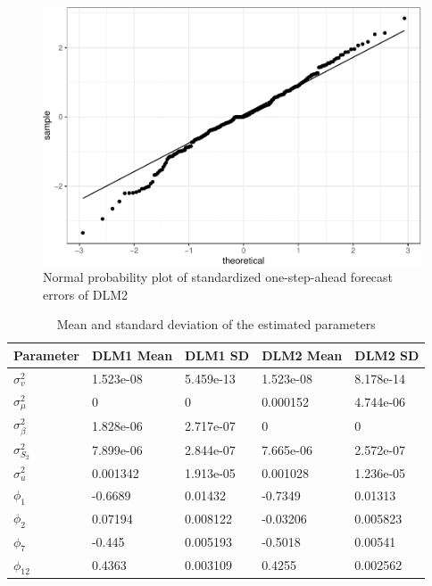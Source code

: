\documentclass[]{article}
\begin{document}
\begin{figure}
\centering
\includegraphics{../figs/freq--qqnorm-1.pdf}
\caption{\label{fig:qqnorm}Normal probability plot of standardized
one-step-ahead forecast errors of DLM2}
\end{figure}

\begin{table}[t]

\caption{\label{tab:par-comparison}Mean and standard deviation of the estimated parameters}
\centering
\begin{tabular}{lllll}
\toprule
Parameter & DLM1 Mean & DLM1 SD & DLM2 Mean & DLM2 SD\\
\midrule
$\sigma_{v}^{2}$ & 1.523e-08 & 5.459e-13 & 1.523e-08 & 8.178e-14\\
$\sigma_{\mu}^{2}$ & 0 & 0 & 0.000152 & 4.744e-06\\
$\sigma_{\beta}^{2}$ & 1.828e-06 & 2.717e-07 & 0 & 0\\
$\sigma_{S_{2}}^{2}$ & 7.899e-06 & 2.844e-07 & 7.665e-06 & 2.572e-07\\
$\sigma^{2}_{u}$ & 0.001342 & 1.913e-05 & 0.001028 & 1.236e-05\\
\addlinespace
$\phi_{1}$ & -0.6689 & 0.01432 & -0.7349 & 0.01313\\
$\phi_{2}$ & 0.07194 & 0.008122 & -0.03206 & 0.005823\\
$\phi_{7}$ & -0.445 & 0.005193 & -0.5018 & 0.00541\\
$\phi_{12}$ & 0.4363 & 0.003109 & 0.4255 & 0.002562\\
\bottomrule
\end{tabular}
\end{table}
\end{document}
